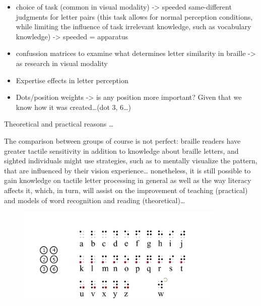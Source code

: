 \documentclass[
  english,
  man]{apa7}
\begin{document}
\begin{itemize}
\item
  choice of task (common in visual modality) -\textgreater{} speeded same-different judgments for letter pairs (this task allows for normal perception conditions, while limiting the influence of task irrelevant knowledge, such as vocabulary knowledge) -\textgreater{} speeded = apparatus
\item
  confussion matrices to examine what determines letter similarity in braille -\textgreater{} as research in visual modality
\item
  Expertise effects in letter perception
\item
  Dots/position weights -\textgreater{} is any position more important? Given that we know how it was created\ldots(dot 3, 6\ldots)
\end{itemize}

{\colorbox{blue}{\sffamily\scriptsize\bfseries\color{white}{abl}}}{\sffamily\small\itshape\color{blue}{importance}}

Theoretical and practical reasons \ldots{}

{\colorbox{blue}{\sffamily\scriptsize\bfseries\color{white}{abl}}}{\sffamily\small\itshape\color{blue}{limitations on interpretation}}

The comparison between groups of course is not perfect: braille readers have greater tactile sensitivity in addition to knowledge about braille letters, and sighted individuals might use strategies, such as to mentally visualize the pattern, that are influenced by their vision experience\ldots{} nonetheless, it is still possible to gain knowledge on tactile letter processing in general as well as the way literacy affects it, which, in turn, will assist on the improvement of teaching (practical) and models of word recognition and reading (theoretical)\ldots{}

\begin{figure}
\includegraphics[width=3.91in]{FigureBraille_Eng_2} \caption{ }\label{fig:BrailleAlphabet}
\end{figure}
\end{document}
